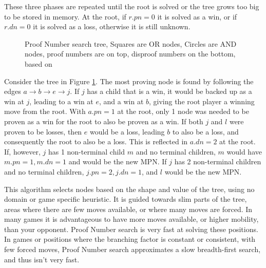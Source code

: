 These three phases are repeated until the root is solved or the tree grows too big to be stored in memory. At the root, if $r.pn = 0$ it is solved as a win, or if $r.dn = 0$ it is solved as a loss, otherwise it is still unknown.

\begin{figure}
\centering
{}
\caption{Proof Number search tree, Squares are OR nodes, Circles are AND nodes, proof numbers are on top, disproof numbers on the bottom, based on \cite{winands2003-PDS-PN}}
\label{fig:pntree}
\end{figure}

Consider the tree in Figure \ref{fig:pntree}. The most proving node is found by following the edges $a \rightarrow b \rightarrow e \rightarrow j$. If $j$ has a child that is a win, it would be backed up as a win at $j$, leading to a win at $e$, and a win at $b$, giving the root player a winning move from the root. With $a.pn = 1$ at the root, only 1 node was needed to be proven as a win for the root to also be proven as a win. If both $j$ and $l$ were proven to be losses, then $e$ would be a loss, leading $b$ to also be a loss, and consequently the root to also be a loss. This is reflected in $a.dn = 2$ at the root. If, however, $j$ has 1 non-terminal child $m$ and no terminal children, $m$ would have $m.pn = 1, m.dn = 1$ and would be the new MPN. If $j$ has 2 non-terminal children and no terminal children, $j.pn = 2, j.dn = 1$, and $l$ would be the new MPN. 

This algorithm selects nodes based on the shape and value of the tree, using no domain or game specific heuristic. It is guided towards slim parts of the tree, areas where there are few moves available, or where many moves are forced. In many games it is advantageous to have more moves available, or higher mobility, than your opponent. Proof Number search is very fast at solving these positions. In games or positions where the branching factor is constant or consistent, with few forced moves, Proof Number search approximates a slow breadth-first search, and thus isn't very fast.

